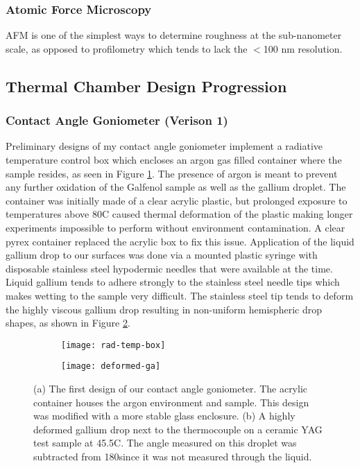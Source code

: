 \subsubsection{Atomic Force Microscopy}

AFM is one of the simplest ways to determine roughness at the sub-nanometer scale, as opposed to profilometry which tends to lack the $<$100 nm resolution.

\subsection{Thermal Chamber Design Progression}
\subsubsection{Contact Angle Goniometer (Verison 1)}
Preliminary designs of my contact angle goniometer implement a radiative temperature control box which encloses an argon gas filled container where the sample resides, as seen in Figure \ref{fig:rad-temp-box}.  The presence of argon is meant to prevent any further oxidation of the Galfenol sample as well as the gallium droplet. The container was initially made of a clear acrylic plastic, but prolonged exposure to temperatures above 80\degree C caused thermal deformation of the plastic making longer experiments impossible to perform without environment contamination.  A clear pyrex container replaced the acrylic box to fix this issue.  Application of the liquid gallium drop to our surfaces was done via a mounted plastic syringe with disposable stainless steel hypodermic needles that were available at the time. Liquid gallium tends to adhere strongly to the stainless steel needle tips which makes wetting to the sample very difficult. The stainless steel tip tends to deform the highly viscous gallium drop resulting in non-uniform hemispheric drop shapes, as shown in Figure \ref{fig:deformed-ga}.
\begin{figure}[h]
	\centering
	\begin{subfigure}[c]{0.45\textwidth}
		\texttt{[image: rad-temp-box]}
		\subcaption{~}
		\label{fig:rad-temp-box}		
	\end{subfigure}
	\begin{subfigure}[c]{0.45\textwidth} 
		\texttt{[image: deformed-ga]}
		\subcaption{~}
		\label{fig:deformed-ga}		
	\end{subfigure}
	\caption{(a) The first design of our contact angle goniometer.  The acrylic container houses the argon environment and sample.  This design was modified with a more stable glass enclosure. (b) A highly deformed gallium drop next to the thermocouple on a ceramic YAG test sample at 45.5\degree C. The angle measured on this droplet was subtracted from 180\degree since it was not measured through the liquid.}
	\label{fig:prelim-design}
\end{figure}



